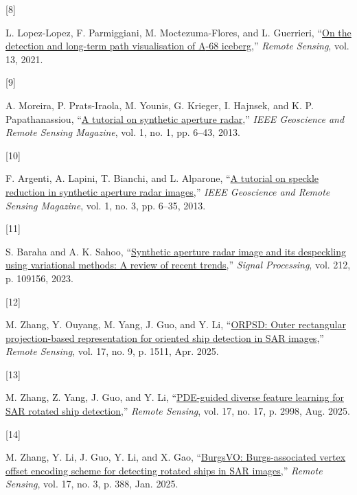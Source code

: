 \documentclass[
  lettersize  journal,
]{IEEEtran}%
\newlength{\cslhangindent}
\newlength{\csllabelwidth}
\newenvironment{CSLReferences}[2] %
 {\begin{list}{}{%
  \setlength{\itemindent}{0pt}
  \setlength{\leftmargin}{0pt}
  \setlength{\parsep}{0pt}
  \ifodd #1
   \setlength{\leftmargin}{\cslhangindent}
   \setlength{\itemindent}{-1\cslhangindent}
  \fi
  \setlength{\itemsep}{#2\baselineskip}}}
 {\end{list}}
\newcommand{\CSLLeftMargin}[1]{\parbox[t]{\csllabelwidth}{\strut#1\strut}}
\newcommand{\CSLRightInline}[1]{\parbox[t]{\linewidth - \csllabelwidth}{\strut#1\strut}}
\begin{document}
\begin{CSLReferences}{0}{0}
\CSLLeftMargin{{[}8{]} }%
\CSLRightInline{L. Lopez-Lopez, F. Parmiggiani, M. Moctezuma-Flores, and
L. Guerrieri, {``\href{https://doi.org/10.3390/rs13030460}{On the
detection and long-term path visualisation of {A}-68 iceberg},''}
\emph{Remote Sensing}, vol. 13, 2021. }

\CSLLeftMargin{{[}9{]} }%
\CSLRightInline{A. Moreira, P. Prats-Iraola, M. Younis, G. Krieger, I.
Hajnsek, and K. P. Papathanassiou,
{``\href{https://doi.org/10.1109/mgrs.2013.2248301}{A tutorial on
synthetic aperture radar},''} \emph{IEEE Geoscience and Remote Sensing
Magazine}, vol. 1, no. 1, pp. 6--43, 2013. }

\CSLLeftMargin{{[}10{]} }%
\CSLRightInline{F. Argenti, A. Lapini, T. Bianchi, and L. Alparone,
{``\href{https://doi.org/10.1109/mgrs.2013.2277512}{A tutorial on
speckle reduction in synthetic aperture radar images},''} \emph{IEEE
Geoscience and Remote Sensing Magazine}, vol. 1, no. 3, pp. 6--35, 2013.
}

\CSLLeftMargin{{[}11{]} }%
\CSLRightInline{S. Baraha and A. K. Sahoo,
{``\href{https://doi.org/10.1016/j.sigpro.2023.109156}{Synthetic
aperture radar image and its despeckling using variational methods: A
review of recent trends},''} \emph{Signal Processing}, vol. 212, p.
109156, 2023. }

\CSLLeftMargin{{[}12{]} }%
\CSLRightInline{M. Zhang, Y. Ouyang, M. Yang, J. Guo, and Y. Li,
{``\href{https://doi.org/10.3390/rs17091511}{{ORPSD}: Outer rectangular
projection-based representation for oriented ship detection in {SAR}
images},''} \emph{Remote Sensing}, vol. 17, no. 9, p. 1511, Apr. 2025. }

\CSLLeftMargin{{[}13{]} }%
\CSLRightInline{M. Zhang, Z. Yang, J. Guo, and Y. Li,
{``\href{https://doi.org/10.3390/rs17172998}{{PDE}-guided diverse
feature learning for {SAR} rotated ship detection},''} \emph{Remote
Sensing}, vol. 17, no. 17, p. 2998, Aug. 2025. }

\CSLLeftMargin{{[}14{]} }%
\CSLRightInline{M. Zhang, Y. Li, J. Guo, Y. Li, and X. Gao,
{``\href{https://doi.org/10.3390/rs17030388}{{BurgsVO}:
{B}urgs-associated vertex offset encoding scheme for detecting rotated
ships in {SAR} images},''} \emph{Remote Sensing}, vol. 17, no. 3, p.
388, Jan. 2025. }


\end{CSLReferences}
\end{document}
